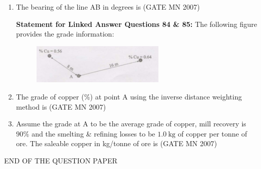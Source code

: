 \documentclass[journal]{IEEEtran}
\begin{document}
\begin{enumerate}
\item The bearing of the line AB in degrees is  
	\hfill (GATE MN 2007)
\begin{enumerate}
\end{enumerate}
\textbf{Statement for Linked Answer Questions 84 \& 85:} The following figure provides the grade information:

\begin{figure}[H]
    \centering                                  
\includegraphics[width=0.6\textwidth]{Screenshot_2025_0812_201406.png}                 
\caption{}
	\label{fig:Q84&Q85}
\end{figure}

\item The grade of copper (\%) at point A using the inverse distance weighting method is  
	\hfill (GATE MN 2007)
\begin{enumerate}
\end{enumerate}

\item Assume the grade at A to be the average grade of copper, mill recovery is $90\%$ and the smelting \& refining losses to be $1.0 \ \mathrm{kg}$ of copper per tonne of ore. The saleable copper in kg/tonne of ore is  
	\hfill (GATE MN 2007)
\begin{enumerate}
\end{enumerate}




\end{enumerate}
\begin{center}                                  
\huge{END OF THE QUESTION PAPER}    
\end{center}
\end{document}
